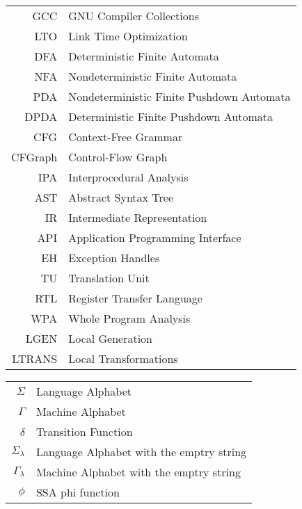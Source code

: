 \begin{tabular}{rl}
	GCC & GNU Compiler Collections \\
	LTO & Link Time Optimization \\
	DFA & Deterministic Finite Automata \\
	NFA & Nondeterministic Finite Automata \\
	PDA & Nondeterministic Finite Pushdown Automata \\
	DPDA & Deterministic Finite Pushdown Automata \\
	CFG & Context-Free Grammar \\
	CFGraph & Control-Flow Graph \\
	IPA & Interprocedural Analysis \\
	AST & Abstract Syntax Tree \\
	IR  & Intermediate Representation \\
	API & Application Programming Interface \\
	EH  & Exception Handles \\
	TU  & Translation Unit \\
	RTL & Register Transfer Language\\
	WPA & Whole Program Analysis\\
	LGEN & Local Generation\\
	LTRANS & Local Transformations\\
\end{tabular}

\newpage

\begin{tabular}{rl}
        $\Sigma$    & Language Alphabet\\
        $\Gamma$    & Machine Alphabet\\
		$\delta$    & Transition Function\\
		$\Sigma_{\lambda}$ & Language Alphabet with the emptry string\\
		$\Gamma_{\lambda}$ & Machine Alphabet with the emptry string\\
		$\phi$ & SSA phi function\\
\end{tabular}

